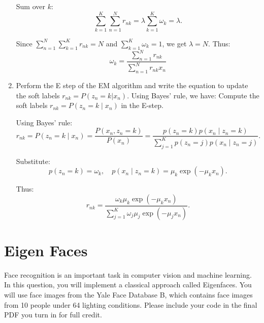 \documentclass[a3paper,12pt]{extarticle} %
\begin{document}
\begin{enumerate}
   Sum over $k$:
   \[
   \sum_{k=1}^K \sum_{n=1}^N r_{nk} = \lambda \sum_{k=1}^K \omega_k = \lambda.
   \]
   
   Since $\sum_{n=1}^N \sum_{k=1}^K r_{nk} = N$ and $\sum_{k=1}^K \omega_k = 1$, we get $\lambda = N$. Thus:
   \[
   \omega_k = \frac{\sum_{n=1}^N r_{nk}}{\sum_{n=1}^N r_{nk}x_n}
   \]
    \item Perform the E step of the EM algorithm and write the equation to update the soft labels $r_{nk} = P(z_n = k|x_n)$. Using Bayes' rule, we have:
    Compute the soft labels $r_{nk} = P(z_n = k \mid x_n)$ in the E-step.

Using Bayes' rule:
\[
r_{nk} = P(z_n = k \mid x_n) = \frac{P(x_n, z_n = k)}{P(x_n)} = \frac{p(z_n = k) p(x_n \mid z_n = k)}{\sum_{j=1}^K p(z_n = j) p(x_n \mid z_n = j)}.
\]

Substitute:
\[
p(z_n = k) = \omega_k, \quad p(x_n \mid z_n = k) = \mu_k \exp(-\mu_k x_n).
\]

Thus:
\[
r_{nk} = \frac{\omega_k \mu_k \exp(-\mu_k x_n)}{\sum_{j=1}^K \omega_j \mu_j \exp(-\mu_j x_n)}.
\]
\end{enumerate}

\newpage
\section{Eigen Faces}
Face recognition is an important task in computer vision and machine learning. In this question, you will
implement a classical approach called Eigenfaces. You will use face images from the Yale Face Database
B, which contains face images from 10 people under 64 lighting conditions. Please include your code in
the final PDF you turn in for full credit.
\end{document}
